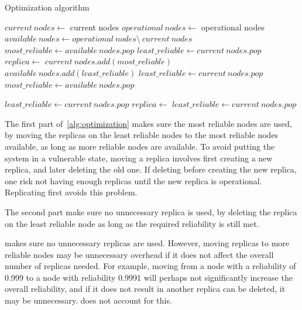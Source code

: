 \documentclass{cslthse-msc}
\begin{document}
\begin{algorithm} 
	\caption{Optimization algorithm} \label{alg:optimization}
	\begin{algorithmic}[1]
	\State $current\ nodes\gets $ current nodes
	\State $operational\ nodes\gets $ operational nodes
	\State $available\ nodes\gets operational\ nodes \setminus \ current\ nodes$
	\State
	\State
	\State $most\_reliable\gets available\ nodes.pop$
	\State
	\State $least\_reliable\gets current\ nodes.pop$
	\State
			\State $replica\gets $
			\State
			\State
			\State
			\State $current\ nodes.add(most\_reliable)$
			\State $available\ nodes.add(least\_reliable)$
			\State $least\_reliable\gets current\ nodes.pop$
			\State $most\_reliable\gets available\ nodes.pop$
	\EndWhile
	\EndProcedure
	\State
	
	\State $least\_reliable\gets current\ nodes.pop$
		\State $replica\gets $
		\State
		\State $least\_reliable\gets current\ nodes.pop$
	\EndWhile
	\EndProcedure
	\end{algorithmic}
\end{algorithm}

The first part of~\cref{alg:optimization} makes sure the most reliable nodes are used, by moving the replicas on the least reliable nodes to the most reliable nodes available, as long as more reliable nodes are available. To avoid putting the system in a vulnerable state, moving a replica involves first creating a new replica, and later deleting the old one. If deleting before creating the new replica, one risk not having enough replicas until the new replica is operational. Replicating first avoids this problem.

The second part make sure no unnecessary replica is used, by deleting the replica on the least reliable node as long as the required reliability is still met.

 makes sure no unnecessary replicas are used. However, moving replicas to more reliable nodes may be unnecessary overhead if it does not affect the overall number of replicas needed. For example, moving from a node with a reliability of 0.999 to a node with reliability 0.9991 will perhaps not significantly increase the overall reliability, and if it does not result in another replica can be deleted, it may be unnecessary.  does not account for this.
\end{document}
